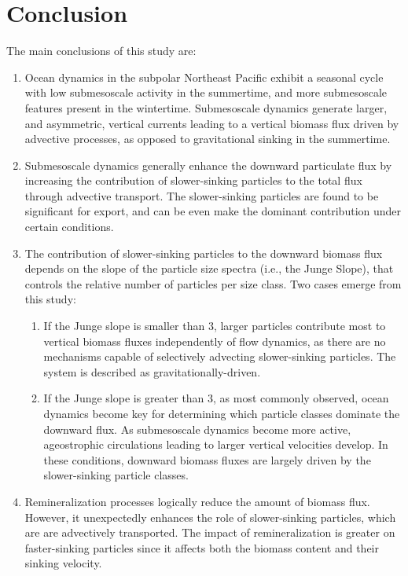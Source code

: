 \documentclass[article,linenumbers]{agujournal2018}
\begin{document}
	\section{Conclusion}
	\label{sec: Conclusions}
	The main conclusions of this study are: 
	\begin{enumerate}
		\item Ocean dynamics in the subpolar Northeast Pacific exhibit a seasonal cycle with low submesoscale activity in the summertime, and more submesoscale features present in the wintertime. Submesoscale dynamics generate larger, and asymmetric, vertical currents leading to a vertical biomass flux driven by advective processes, as opposed to gravitational sinking in the summertime.
		
		\item Submesoscale dynamics generally enhance the downward particulate flux by increasing the contribution of slower-sinking particles to the total flux through advective transport.   The  slower-sinking particles are found to be significant for export, and can be even make the dominant contribution under certain conditions.
		\item The contribution of slower-sinking particles to the downward biomass flux depends on the slope of the particle size spectra (i.e., the Junge Slope), that controls the relative number of particles per size class. Two cases emerge from this study:
		\begin{enumerate}
			\item If the Junge slope is smaller than 3, larger particles contribute most to vertical biomass fluxes independently of flow dynamics, as there are no mechanisms capable of selectively advecting slower-sinking particles. The system is described as gravitationally-driven.
			\item If the Junge slope is greater than 3, as most commonly observed, ocean dynamics become key for determining which particle classes dominate the downward flux. As submesoscale dynamics become more active, ageostrophic circulations leading to larger vertical velocities develop. In these conditions, downward biomass fluxes are largely driven by the slower-sinking particle classes.
		\end{enumerate}
		\item Remineralization processes logically reduce the amount of biomass flux. However, it unexpectedly enhances the role of slower-sinking particles, which are are advectively transported. The impact of remineralization is greater on faster-sinking particles since it affects both the biomass content and their sinking velocity.
	\end{enumerate}
	
\end{document}
